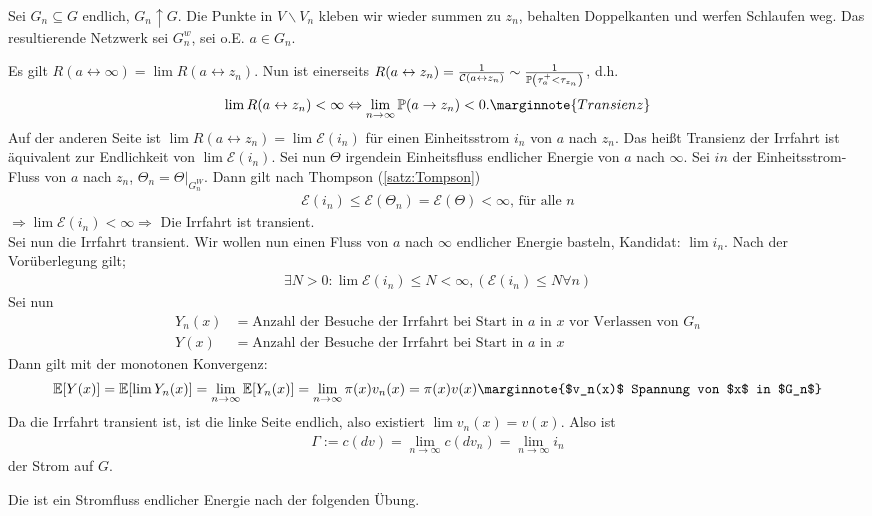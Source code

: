 \begin{beweis}
	Sei $G_n  \subseteq G$ endlich, $G_n \uparrow G$. Die Punkte in $V \backslash V_n$ kleben wir wieder summen zu $z_n$, behalten Doppelkanten und werfen Schlaufen weg. Das resultierende Netzwerk sei $G^w_n$, sei o.E. $a \in G_n$. 
	
	Es gilt $R(a \leftrightarrow \infty) = \lim R(a \leftrightarrow z_n)$.
	Nun ist einerseits $R(a \leftrightarrow z_n) = \frac{1}{\leit{a \leftrightarrow z_n}} \sim \frac{1}{\prop{\tau^+_a < \tau_{z_n}}}$, d.h. 
	\begin{equation}
	\lim R(a \leftrightarrow z_n) < \infty \Leftrightarrow \lim\limits_{n \to \infty} \prop{a \to z_n} < 0. \marginnote{Transienz}
	\end{equation}
	Auf der anderen Seite ist $\lim R(a \leftrightarrow z_n) = \lim \mathcal{E}(i_n)$ für einen Einheitsstrom $i_n$ von $a$ nach $z_n$. Das heißt Transienz der Irrfahrt ist äquivalent zur Endlichkeit von $\lim \mathcal{E}(i_n)$. Sei nun $\Theta$ irgendein Einheitsfluss endlicher Energie von $a$ nach $\infty$. Sei $in$ der Einheitsstrom-Fluss von $a$ nach $z_n$, $\Theta_n = \Theta|_{G^W_n}$. Dann gilt nach Thompson (\ref{satz:Tompson})
	\begin{align}
	\mathcal{E}(i_n) \leq \mathcal{E}(\Theta_n) = \mathcal{E}(\Theta) < \infty \text{, für alle } n
	\end{align}
	$\Rightarrow \lim \mathcal{E}(i_n) < \infty \Rightarrow$ Die Irrfahrt ist transient. \\
	
	Sei nun die Irrfahrt transient. Wir wollen nun einen Fluss von $a$ nach $\infty$ endlicher Energie basteln, Kandidat: $\lim i_n.$ Nach der Vorüberlegung gilt;
	\begin{align}
	\exists N > 0: \lim \mathcal{E}(i_n) \leq N < \infty, (\mathcal{E}(i_n)\leq N \forall n)
	\end{align}
	Sei nun 
	\begin{align}
	Y_n(x) &= \text{Anzahl der Besuche der Irrfahrt bei Start in $a$ in $x$ vor Verlassen von } G_n \\
	Y(x) &= \text{Anzahl der Besuche der Irrfahrt bei Start in $a$ in $x$} 
	\end{align}
	Dann gilt mit der monotonen Konvergenz:
	\begin{align}
	\EWE{Y(x)} = \EWE{\lim Y_n(x)} = \lim\limits_{n \to \infty} \EWE{Y_n(x)} = \lim\limits_{n \to \infty} \pi(x) v_n(x) = \pi(x)v(x) \marginnote{$v_n(x)$ Spannung von $x$ in $G_n$}
	\end{align}
	Da die Irrfahrt transient ist, ist die linke Seite endlich, also existiert $\lim v_n(x) = v(x)$. Also ist
	\begin{align}
	\Gamma := c (dv) = \lim\limits_{n\to\infty} c (dv_n) = \lim\limits_{n\to\infty} i_n
	\end{align}
	der Strom auf $G$.
	
	Die ist ein Stromfluss endlicher Energie nach der folgenden Übung.
\end{beweis}

